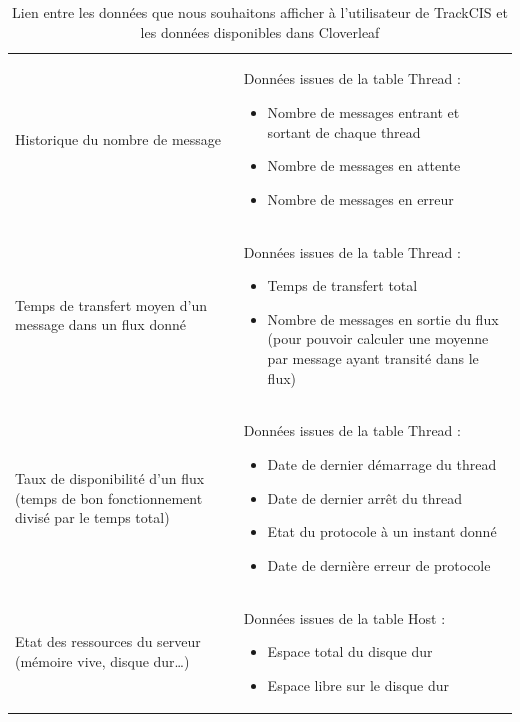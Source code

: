 			\begin{table}[H]
				\centering
				\caption{\label{donnees_threads} Lien entre les données que nous
				souhaitons afficher à l'utilisateur de TrackCIS et les données disponibles
				dans Cloverleaf}
				\begin{tabular}{| p{5cm} | p{8cm} |}
					\hline
						\thead{Type de statistique}
						&\thead{Données dans la table Thread}
						\\
					\hline
						Historique du nombre de message
						&
						Données issues de la table Thread :
						\begin{itemize}
						  \item Nombre de messages entrant et sortant de chaque thread
						  \item Nombre de messages en attente
						  \item Nombre de messages en erreur
						\end{itemize}
						\\
					\hline
						Temps de transfert moyen d'un message dans un flux donné
						&
						Données issues de la table Thread :
						\begin{itemize}
						  \item Temps de transfert total
						  \item Nombre de messages en sortie du flux (pour pouvoir calculer une
						  moyenne par message ayant transité dans le flux)
						\end{itemize}
						\\
					\hline
						Taux de disponibilité d'un flux (temps de bon fonctionnement divisé par le
						temps total)
						&
						Données issues de la table Thread :
						\begin{itemize}
						  \item Date de dernier démarrage du thread
						  \item Date de dernier arrêt du thread
						  \item Etat du protocole à un instant donné
						  \item Date de dernière erreur de protocole
						\end{itemize}
						\\
					\hline
						Etat des ressources du serveur (mémoire vive, disque dur\ldots)
						&
						Données issues de la table Host :
						\begin{itemize}
						  \item Espace total du disque dur
						  \item Espace libre sur le disque dur

\end{itemize}
\end{tabular}
\end{table}
